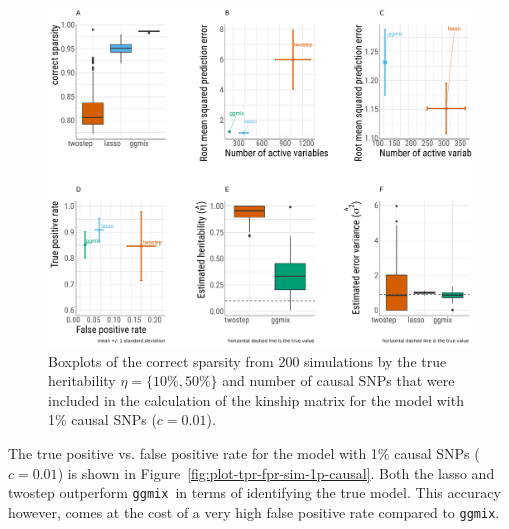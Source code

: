 \documentclass[12pt,letter]{article}\usepackage[]{graphicx}\usepackage[]{color}
\newenvironment{knitrout}{}{} %
\newcommand{\ggmix}{\texttt{ggmix}}
\begin{document}
\begin{knitrout}\scriptsize
{}\color{fgcolor}\begin{figure}[h]

{\centering \includegraphics[width=1\linewidth]{figure/plot-6in1-10percentHerit-1pcausal-allinkinship-1} 

}

\caption[Boxplots of the correct sparsity from 200 simulations by the true heritability $\eta = \lbrace 10\%, 50\% \rbrace$ and number of causal SNPs that were included in the calculation of the kinship matrix for the model with 1\% causal SNPs ($c=0.01$)]{Boxplots of the correct sparsity from 200 simulations by the true heritability $\eta = \lbrace 10\%, 50\% \rbrace$ and number of causal SNPs that were included in the calculation of the kinship matrix for the model with 1\% causal SNPs ($c=0.01$).}\label{fig:plot-6in1-10percentHerit-1pcausal-allinkinship}
\end{figure}


\end{knitrout}


The true positive vs. false positive rate for the model with 1\% causal SNPs ($c=0.01$) is shown in Figure~\ref{fig:plot-tpr-fpr-sim-1p-causal}. Both the lasso and twostep outperform \ggmix ~in terms of identifying the true model. This accuracy however, comes at the cost of a very high false positive rate compared to \ggmix.
\end{document}
